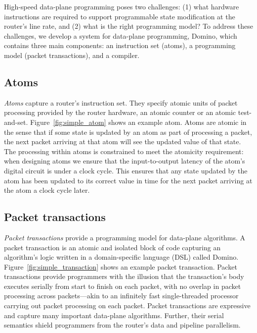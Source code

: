 High-speed data-plane programming poses two challenges: (1) what hardware
instructions are required to support programmable state modification at the
router's line rate, and (2) what is the right programming model? To address
these challenges, we develop a system for data-plane programming, Domino, which
contains three main components: an instruction set (atoms), a programming model
(packet transactions), and a compiler.

\subsection{Atoms} \textit{Atoms} capture a router's instruction set. They
specify atomic units of packet processing provided by the router hardware, \eg
an atomic counter or an atomic test-and-set. Figure~\ref{fig:simple_atom} shows
an example atom. Atoms are atomic in the sense that if some state is updated by
an atom as part of processing a packet, the next packet arriving at that atom
will see the updated value of that state. The processing within atoms is
constrained to meet the atomicity requirement: when designing atoms we ensure
that the input-to-output latency of the atom's digital circuit is under a clock
cycle. This ensures that any state updated by the atom has been updated to its
correct value in time for the next packet arriving at the atom a clock cycle
later.

\subsection{Packet transactions} \textit{Packet transactions} provide a programming
model for data-plane algorithms. A packet transaction is an atomic and isolated
block of code capturing an algorithm's logic written in a domain-specific
language (DSL) called Domino. Figure~\ref{fig:simple_transaction} shows an
example packet transaction.  Packet transactions provide programmers with the
illusion that the transaction's body executes serially from start to finish on
each packet, with no overlap in packet processing across packets---akin to an
infinitely fast single-threaded processor carrying out packet processing on
each packet. Packet transactions are expressive and capture many important
data-plane algorithms.  Further, their serial semantics shield programmers from
the router's data and pipeline parallelism.

